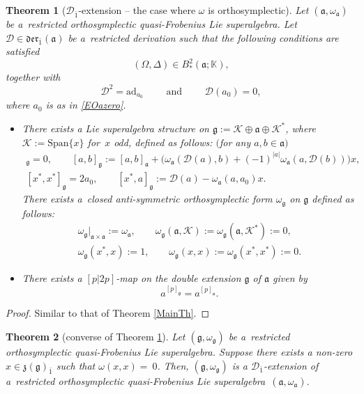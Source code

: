 \documentclass[pdftex]{sigma}
\numberwithin{equation}{section}
\newtheorem{Theorem}{Theorem}[section]
\begin{document}
\begin{Theorem}[${\mathscr D}_{\bar 1}$-extension -- the case where $\omega$ is orthosymplectic] \label{MainThO}
Let $(\mathfrak{a}, \omega_\mathfrak{a})$ be a~restricted orthosymplectic quasi-Frobenius Lie superalgebra. Let ${\mathscr D}\in \mathfrak{der}_{\bar 1}(\mathfrak{a})$ be a~restricted derivation such that the following conditions are satisfied
\[
(\Omega,\Delta) \in B^2_*(\mathfrak{a}; \mathbb{K}),
\]
together with
\[
{\mathscr D}^2=\mathrm{ad}_{a_0} \qquad \text{ and }\qquad {\mathscr D}(a_0)=0,
\]
where $a_0$ is as in \eqref{EOazero}.
\begin{itemize}
\item[$(i)$] There exists a Lie superalgebra structure on $\mathfrak{g}:=\mathscr{K} \oplus \mathfrak{a} \oplus \mathscr{K} ^*$, where $\mathscr{K} :=\mathrm{Span}\{x\}$ for~$x$ odd, defined as follows: $($for any $a, b\in \mathfrak{a})$
\begin{gather*}
[\mathscr{K} ,\mathfrak{g}]_\mathfrak{g}=0, \qquad [a,b]_\mathfrak{g} := [a,b]_\mathfrak{a} + \bigl(\omega_\mathfrak{a}( {\mathscr D}(a), b) +(-1)^{|a|} \omega_\mathfrak{a}(a, {\mathscr D}(b))\bigr)x, \\
[x^*, x^*]_\mathfrak{g}=2 a_0, \qquad [x^*,a]_\mathfrak{g} := {\mathscr D}(a) - \omega_\mathfrak{a}(a,a_0)x.
\end{gather*}
There exists a~closed anti-symmetric orthosymplectic form $\omega_\mathfrak{g}$ on $\mathfrak{g}$ defined as follows:
\begin{gather*}
{\omega_\mathfrak{g}}\vert_{\mathfrak{a} \times \mathfrak{a}}:= \omega_\mathfrak{a}, \qquad \omega_\mathfrak{g}(\mathfrak{a},\mathscr{K} ):=\omega_\mathfrak{g}(\mathfrak{a},\mathscr{K} ^*):=0, \\ \omega_\mathfrak{g}(x^*,x):=1, \qquad
\omega_\mathfrak{g}(x,x):=\omega_\mathfrak{g}(x^*,x^*) :=0.
\end{gather*}
\item[$(ii)$] There exists a $[p|2p]$-map on the double extension $\mathfrak{g}$ of $\mathfrak{a}$ given by
\[
a^{[p]_\mathfrak{g}} = a^{[p]_\mathfrak{a}}.
\]
\end{itemize}
\end{Theorem}
\begin{proof}
 Similar to that of Theorem \ref{MainTh}.
\end{proof}
\begin{Theorem}[converse of Theorem \ref{MainThO}]\label{Rec2}
Let $(\mathfrak{g},\omega_\mathfrak{g})$ be a~restricted orthosymplectic quasi-Frobenius Lie superalgebra. Suppose there exists a non-zero $x \in \mathfrak{z}(\mathfrak{g})_{\bar 1}$ such that $\omega(x,x)=~0$. Then, $(\mathfrak{g},\omega_\mathfrak{g})$ is a ${\mathscr D}_{\bar 1}$-extension of a~restricted orthosymplectic quasi-Frobenius Lie superalgebra~$(\mathfrak{a},\omega_\mathfrak{a})$.
\end{Theorem}
\end{document}
